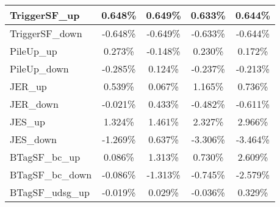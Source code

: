 \begin{table}[]
{\begin{tabular}{|l|c|c|c|c|}
TriggerSF\_up                               & 0.648\%                                & 0.649\%                                & 0.633\%                               & 0.644\%                                \\ \hline 
TriggerSF\_down                             & -0.648\%                              & -0.649\%                              & -0.633\%                             & -0.644\%                              \\ \hline 
PileUp\_up                             & 0.273\%                              & -0.148\%                              & 0.230\%                             & 0.172\%                              \\ \hline 
PileUp\_down                           & -0.285\%                            & 0.124\%                            & -0.237\%                           & -0.213\%                            \\ \hline 
JER\_up                         & 0.539\%                          & 0.067\%                          & 1.165\%                         & 0.736\%                          \\ \hline     
JER\_down                       & -0.021\%                        & 0.433\%                        & -0.482\%                       & -0.611\%                        \\ \hline    
JES\_up                                 & 1.324\%                                  & 1.461\%                                  & 2.327\%                                 & 2.966\%                                  \\ \hline    
JES\_down                               & -1.269\%                                & 0.637\%                                & -3.306\%                               & -3.464\%                                \\ \hline    
BTagSF\_bc\_up                              & 0.086\%                               & 1.313\%                               & 0.730\%                              & 2.609\%                               \\ \hline    
BTagSF\_bc\_down                            & -0.086\%                             & -1.313\%                             & -0.745\%                            & -2.579\%                             \\ \hline    
BTagSF\_udsg\_up                            & -0.019\%                             & 0.029\%                             & -0.036\%                            & 0.329\%                             \\ \hline     

\end{tabular}}
\end{table}

